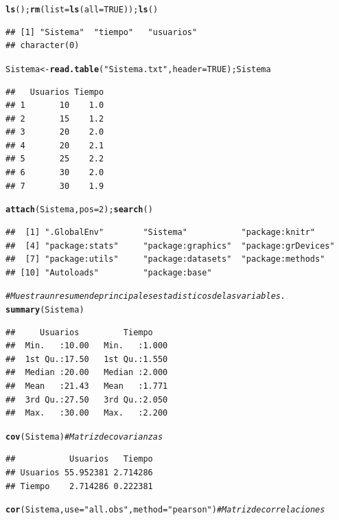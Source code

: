 \documentclass{article}\usepackage[]{graphicx}\usepackage[]{color}
\makeatletter
\newcommand{\hlnum}[1]{\textcolor[rgb]{0.686,0.059,0.569}{#1}}%
\newcommand{\hlstr}[1]{\textcolor[rgb]{0.192,0.494,0.8}{#1}}%
\newcommand{\hlcom}[1]{\textcolor[rgb]{0.678,0.584,0.686}{\textit{#1}}}%
\newcommand{\hlstd}[1]{\textcolor[rgb]{0.345,0.345,0.345}{#1}}%
\newcommand{\hlkwb}[1]{\textcolor[rgb]{0.69,0.353,0.396}{#1}}%
\newcommand{\hlkwc}[1]{\textcolor[rgb]{0.333,0.667,0.333}{#1}}%
\newcommand{\hlkwd}[1]{\textcolor[rgb]{0.737,0.353,0.396}{\textbf{#1}}}%
\newenvironment{kframe}{%
 \def\at@end@of@kframe{}%
 \ifinner\ifhmode%
  \def\at@end@of@kframe{\end{minipage}}%
  \begin{minipage}{\columnwidth}%
 \fi\fi%
 \def\FrameCommand##1{\hskip\@totalleftmargin \hskip-\fboxsep
 \colorbox{shadecolor}{##1}\hskip-\fboxsep
     \hskip-\linewidth \hskip-\@totalleftmargin \hskip\columnwidth}%
 \MakeFramed {\advance\hsize-\width
   \@totalleftmargin\z@ \linewidth\hsize
   \@setminipage}}%
 {\par\unskip\endMakeFramed%
 \at@end@of@kframe}
\newenvironment{knitrout}{}{} %
\makeatother
\begin{document}
\begin{knitrout}
\begin{kframe}
\begin{alltt}
\hlkwd{ls}\hlstd{();} \hlkwd{rm}\hlstd{(}\hlkwc{list}\hlstd{=}\hlkwd{ls}\hlstd{(}\hlkwc{all}\hlstd{=}\hlnum{TRUE}\hlstd{));} \hlkwd{ls}\hlstd{()}
\end{alltt}
\begin{verbatim}
## [1] "Sistema"  "tiempo"   "usuarios"
## character(0)
\end{verbatim}
\begin{alltt}
\hlstd{Sistema} \hlkwb{<-} \hlkwd{read.table}\hlstd{(}\hlstr{"Sistema.txt"}\hlstd{,} \hlkwc{header}\hlstd{=}\hlnum{TRUE}\hlstd{); Sistema}
\end{alltt}
\begin{verbatim}
##   Usuarios Tiempo
## 1       10    1.0
## 2       15    1.2
## 3       20    2.0
## 4       20    2.1
## 5       25    2.2
## 6       30    2.0
## 7       30    1.9
\end{verbatim}
\begin{alltt}
\hlkwd{attach}\hlstd{(Sistema,} \hlkwc{pos}\hlstd{=}\hlnum{2}\hlstd{);} \hlkwd{search}\hlstd{()}
\end{alltt}
\begin{verbatim}
##  [1] ".GlobalEnv"        "Sistema"           "package:knitr"    
##  [4] "package:stats"     "package:graphics"  "package:grDevices"
##  [7] "package:utils"     "package:datasets"  "package:methods"  
## [10] "Autoloads"         "package:base"
\end{verbatim}
\begin{alltt}
\hlcom{#Muestra un resumen de principales estadisticos de las variables.}
\hlkwd{summary}\hlstd{(Sistema)}
\end{alltt}
\begin{verbatim}
##     Usuarios         Tiempo     
##  Min.   :10.00   Min.   :1.000  
##  1st Qu.:17.50   1st Qu.:1.550  
##  Median :20.00   Median :2.000  
##  Mean   :21.43   Mean   :1.771  
##  3rd Qu.:27.50   3rd Qu.:2.050  
##  Max.   :30.00   Max.   :2.200
\end{verbatim}
\begin{alltt}
\hlkwd{cov}\hlstd{(Sistema)} \hlcom{# Matriz de covarianzas}
\end{alltt}
\begin{verbatim}
##           Usuarios   Tiempo
## Usuarios 55.952381 2.714286
## Tiempo    2.714286 0.222381
\end{verbatim}
\begin{alltt}
\hlkwd{cor}\hlstd{(Sistema,} \hlkwc{use} \hlstd{=} \hlstr{"all.obs"}\hlstd{,} \hlkwc{method}\hlstd{=}\hlstr{"pearson"}\hlstd{)} \hlcom{# Matriz de correlaciones}

\end{alltt}
\end{kframe}
\end{knitrout}
\end{document}
